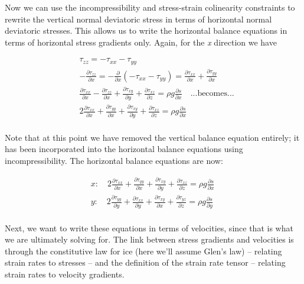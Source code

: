 Now we can use the incompressibility and stress-strain colinearity constraints to rewrite the vertical normal deviatoric stress in terms of horizontal normal deviatoric stresses. This allows us to write the horizontal balance equations in terms of horizontal stress gradients only. Again, for the \textit{x} direction we have

\begin{align*}
  & \tau _{zz}=-\tau _{xx}-\tau _{yy} \\ 
 & -\frac{\partial \tau _{zz}}{\partial x}=-\frac{\partial }{\partial x}\left( -\tau _{xx}-\tau _{yy} \right)=\frac{\partial \tau _{xx}}{\partial x}+\frac{\partial \tau _{yy}}{\partial x} \\ 
 & \frac{\partial \tau _{xx}}{\partial x}-\frac{\partial \tau _{zz}}{\partial x}+\frac{\partial \tau _{xy}}{\partial y}+\frac{\partial \tau _{xz}}{\partial z}=\rho g\frac{\partial s}{\partial x}\quad ...\text{becomes}... \\ 
 & 2\frac{\partial \tau _{xx}}{\partial x}+\frac{\partial \tau _{yy}}{\partial x}+\frac{\partial \tau _{xy}}{\partial y}+\frac{\partial \tau _{xz}}{\partial z}=\rho g\frac{\partial s}{\partial x}\quad  \\ 
\end{align*}

Note that at this point we have removed the vertical balance equation entirely; it has been incorporated into the horizontal balance equations using incompressibility. The horizontal balance equations are now: 

\begin{align*}
  & x:\quad 2\frac{\partial \tau _{xx}}{\partial x}+\frac{\partial \tau _{yy}}{\partial x}+\frac{\partial \tau _{xy}}{\partial y}+\frac{\partial \tau _{xz}}{\partial z}=\rho g\frac{\partial s}{\partial x}\quad  \\ 
 & y:\quad 2\frac{\partial \tau _{yy}}{\partial y}+\frac{\partial \tau _{xx}}{\partial y}+\frac{\partial \tau _{xy}}{\partial x}+\frac{\partial \tau _{yz}}{\partial z}=\rho g\frac{\partial s}{\partial y} \\ 
\end{align*}

Next, we want to write these equations in terms of velocities, since that is what we are ultimately solving for. The link between stress gradients and velocities is through the constitutive law for ice (here we'll assume Glen's law) -- relating strain rates to stresses -- and the definition of the strain rate tensor -- relating strain rates to velocity gradients.

